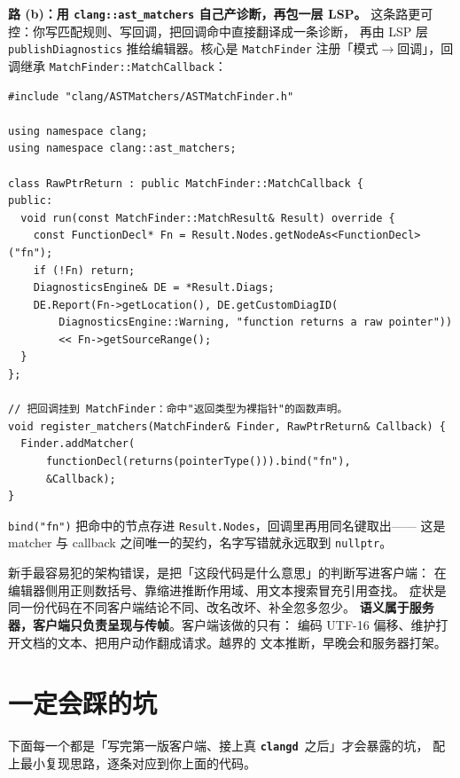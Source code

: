 \documentclass[12pt,a4paper,fontset=fandol]{ctexbook}
\newcommand{\Bk}{\discretionary{}{}{}}
\newcommand{\Lib}[1]{\textbf{\texttt{#1}}}
\newcommand{\CD}{\Lib{clangd}}
\begin{document}
\textbf{路 (b)：用 \texttt{clang::ast\_matchers} 自己产诊断，再包一层 LSP。}
这条路更可控：你写匹配规则、写回调，把回调命中直接翻译成一条诊断，
再由 LSP 层 \texttt{publish}\Bk\texttt{Diagnostics} 推给编辑器。核心是
\texttt{MatchFinder} 注册「模式\(\to\)回调」，回调继承
\texttt{MatchFinder::MatchCallback}：

\begin{lstlisting}[style=cppstyle,caption={MatchFinder 注册与回调：命中裸指针返回的函数就产一条诊断},label={lst:ch08-matcher}]
#include "clang/ASTMatchers/ASTMatchFinder.h"

using namespace clang;
using namespace clang::ast_matchers;

class RawPtrReturn : public MatchFinder::MatchCallback {
public:
  void run(const MatchFinder::MatchResult& Result) override {
    const FunctionDecl* Fn = Result.Nodes.getNodeAs<FunctionDecl>("fn");
    if (!Fn) return;
    DiagnosticsEngine& DE = *Result.Diags;
    DE.Report(Fn->getLocation(), DE.getCustomDiagID(
        DiagnosticsEngine::Warning, "function returns a raw pointer"))
        << Fn->getSourceRange();
  }
};

// 把回调挂到 MatchFinder：命中"返回类型为裸指针"的函数声明。
void register_matchers(MatchFinder& Finder, RawPtrReturn& Callback) {
  Finder.addMatcher(
      functionDecl(returns(pointerType())).bind("fn"),
      &Callback);
}
\end{lstlisting}

\texttt{bind("fn")} 把命中的节点存进 \texttt{Result.Nodes}，回调里再用同名键取出——
这是 matcher 与 callback 之间唯一的契约，名字写错就永远取到 \texttt{nullptr}。

\begin{warning}[title={不要在客户端里做语义计算}]
新手最容易犯的架构错误，是把「这段代码是什么意思」的判断写进客户端：
在编辑器侧用正则数括号、靠缩进推断作用域、用文本搜索冒充引用查找。
症状是同一份代码在不同客户端结论不同、改名改坏、补全忽多忽少。
\textbf{语义属于服务器，客户端只负责呈现与传帧}。客户端该做的只有：
编码 UTF-16 偏移、维护打开文档的文本、把用户动作翻成请求。越界的
文本推断，早晚会和服务器打架。
\end{warning}

\section{一定会踩的坑}\label{sec:ch08-s4}

下面每一个都是「写完第一版客户端、接上真 \CD\ 之后」才会暴露的坑，
配上最小复现思路，逐条对应到你上面的代码。
\end{document}
